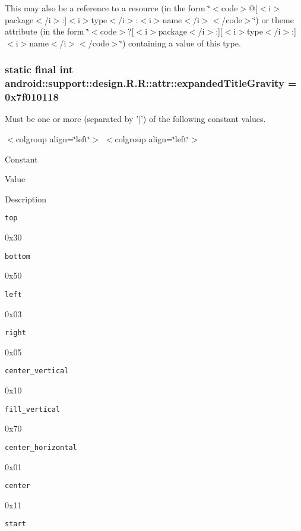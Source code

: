 This may also be a reference to a resource (in the form \char`\"{}$<$code$>$@\mbox{[}$<$i$>$package$<$/i$>$:\mbox{]}$<$i$>$type$<$/i$>$:$<$i$>$name$<$/i$>$$<$/code$>$\char`\"{}) or theme attribute (in the form \char`\"{}$<$code$>$?\mbox{[}$<$i$>$package$<$/i$>$:\mbox{]}\mbox{[}$<$i$>$type$<$/i$>$:\mbox{]}$<$i$>$name$<$/i$>$$<$/code$>$\char`\"{}) containing a value of this type. \hypertarget{classandroid_1_1support_1_1design_1_1_r_1_1attr_d4cda3a0e18d1b1cdb9ce18886899bbd}{
\subsubsection[{expandedTitleGravity}]{\setlength{\rightskip}{0pt plus 5cm}static final int android::support::design.R.R::attr::expandedTitleGravity = 0x7f010118}}
\label{classandroid_1_1support_1_1design_1_1_r_1_1attr_d4cda3a0e18d1b1cdb9ce18886899bbd}


Must be one or more (separated by '$|$') of the following constant values. \begin{TabularC}{0}
\hline
\end{TabularC}
$<$colgroup align=\char`\"{}left\char`\"{}$>$ $<$colgroup align=\char`\"{}left\char`\"{}$>$ 

Constant

Value

Description 

{\tt top}

0x30

{\tt bottom}

0x50

{\tt left}

0x03

{\tt right}

0x05

{\tt center\_\-vertical}

0x10

{\tt fill\_\-vertical}

0x70

{\tt center\_\-horizontal}

0x01

{\tt center}

0x11

{\tt start}

